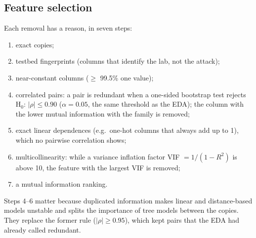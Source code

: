 \documentclass[12pt,a4paper]{article}
\begin{document}
\subsection{Feature selection}
Each removal has a reason, in seven steps:
\begin{enumerate}
  \item exact copies;
  \item testbed fingerprints (columns that identify the lab, not the attack);
  \item near-constant columns ($\geq$ 99.5\% one value);
  \item correlated pairs: a pair is redundant when a one-sided bootstrap test rejects H$_0$: $|\rho| \leq 0.90$
        ($\alpha = 0.05$, the same threshold as the EDA); the column with the lower mutual information with the
        family is removed;
  \item exact linear dependences (e.g.\ one-hot columns that always add up to 1), which no pairwise correlation shows;
  \item multicollinearity: while a variance inflation factor VIF $= 1/(1-R^2)$ is above 10, the feature with the
        largest VIF is removed;
  \item a mutual information ranking.
\end{enumerate}
Steps 4--6 matter because duplicated information makes linear and distance-based models unstable and splits the
importance of tree models between the copies. They replace the former rule ($|\rho| \geq 0.95$), which kept pairs
that the EDA had already called redundant.
\end{document}
